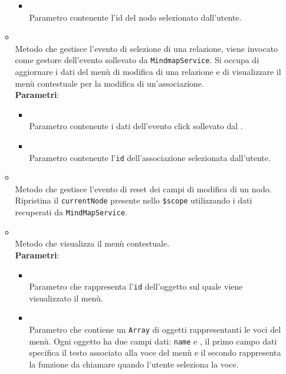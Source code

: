 \begin{itemize}
\begin{itemize}
\begin{itemize}
\item {}
\\ Parametro contenente l'id del nodo selezionato dall'utente.
\end{itemize}
\item {}
\\ Metodo che gestisce l'evento di selezione di una relazione, viene invocato come gestore dell'evento sollevato da \texttt{MindmapService}. Si occupa di aggiornare i dati del menù di modifica di una relazione e di visualizzare il menù contestuale per la modifica di un'associazione.
\\ \textbf{Parametri}:
\begin{itemize}
\item {}
\\ Parametro contenente i dati dell'evento click sollevato dal .
\item {}
\\ Parametro contenente l'\texttt{id} dell'associazione selezionata dall'utente.
\end{itemize}
\item {}
\\ Metodo che gestisce l'evento di reset dei campi di modifica di un nodo. Ripristina il \texttt{currentNode} presente nello \texttt{\$scope} utilizzando i dati recuperati da \texttt{MindMapService}.
\item {}
\\ Metodo che visualizza il menù contestuale.
\\ \textbf{Parametri}:
\begin{itemize}
\item {}
\\ Parametro che rappresenta l'\texttt{id} dell'oggetto sul quale viene visualizzato il menù.
\item {}
\\ Parametro che contiene un \texttt{Array} di oggetti rappresentanti le voci del menù. Ogni oggetto ha due campi dati: \texttt{name} e \texttt{}, il primo campo dati specifica il testo associato alla voce del menù e il secondo rappresenta la funzione da chiamare quando l'utente seleziona la voce.
\end{itemize}

\end{itemize}
\end{itemize}
